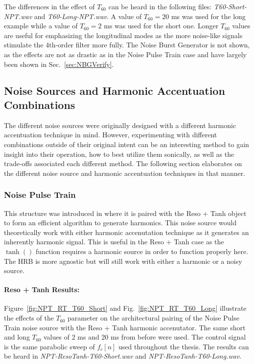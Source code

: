 \documentclass[../main.tex]{subfiles}
\begin{document}
The differences in the effect of $T_{60}$ can be heard in the following files: \emph{T60-Short-NPT.wav} and \emph{T60-Long-NPT.wav}. A value of $T_{60} = 20$ ms was used for the long example while a value of $T_{60} = 2$ ms was used for the short one. Longer $T_{60}$ values are useful for emphasizing the longitudinal modes as the more noise-like signals stimulate the 4th-order filter more fully. The Noise Burst Generator is not shown, as the effects are not as drastic as in the Noise Pulse Train case and have largely been shown in Sec.~\ref{sec:NBGVerify}.

\subsection{Noise Sources and Harmonic Accentuation Combinations}
The different noise sources were originally designed with a different harmonic accentuation technique in mind. However, experimenting with different combinations outside of their original intent can be an interesting method to gain insight into their operation, how to best utilize them sonically, as well as the trade-offs associated each different method. The following section elaborates on the different noise source and harmonic accentuation techniques in that manner.

\subsubsection{Noise Pulse Train}
This structure was introduced in  where it is paired with the Reso + Tanh object to form an efficient algorithm to generate harmonics. This noise source would theoretically work with either harmonic accenutation technique as it generates an inherently harmonic signal. This is useful in the Reso + Tanh case as the $\tanh()$ function requires a harmonic source in order to function properly here. The HRB is more agnostic but will still work with either a harmonic or a noisy source.

\paragraph{Reso + Tanh Results:}
Figure~\ref{fig:NPT_RT_T60_Short} and Fig.~\ref{fig:NPT_RT_T60_Long} illustrate the effects of the $T_{60}$ parameter on the architectural pairing of the Noise Pulse Train noise source with the Reso + Tanh harmonic accenutator. The same short and long $T_{60}$ values of 2 ms and 20 ms from before were used. The control signal is the same parabolic sweep of $f_c[n]$ used throughout the thesis. The results can be heard in \emph{NPT-ResoTanh-T60-Short.wav} and \emph{NPT-ResoTanh-T60-Long.wav}.
\end{document}

